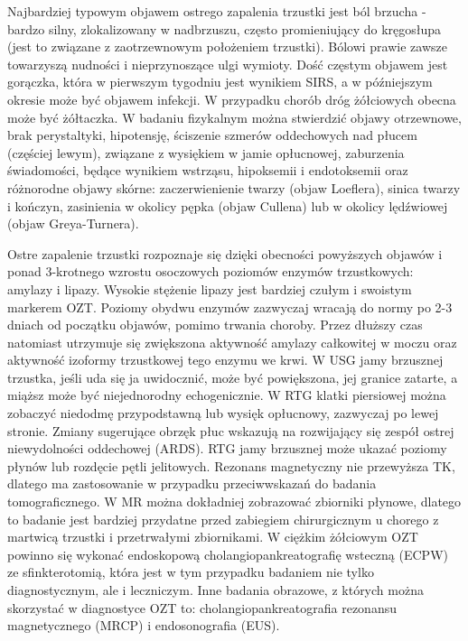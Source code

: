 \documentclass[a4paper, 12pt]{report}
\begin{document}
Najbardziej typowym objawem ostrego zapalenia trzustki jest ból
brzucha - bardzo silny, zlokalizowany w nadbrzuszu, często
promieniujący do kręgosłupa (jest to związane z zaotrzewnowym
położeniem trzustki). Bólowi prawie zawsze towarzyszą nudności i
nieprzynoszące ulgi wymioty. Dość częstym objawem jest gorączka, która
w pierwszym tygodniu jest wynikiem SIRS, a w późniejszym okresie może
być objawem infekcji. W przypadku chorób dróg żółciowych obecna może
być żółtaczka. W badaniu fizykalnym można stwierdzić objawy
otrzewnowe, brak perystaltyki, hipotensję, ściszenie szmerów
oddechowych nad płucem (częściej lewym), związane z wysiękiem w jamie
opłucnowej, zaburzenia świadomości, będące wynikiem wstrząsu,
hipoksemii i endotoksemii oraz różnorodne objawy skórne:
zaczerwienienie twarzy (objaw Loeflera), sinica twarzy i kończyn,
zasinienia w okolicy pępka (objaw Cullena) lub w okolicy lędźwiowej
(objaw Greya-Turnera).

Ostre zapalenie trzustki rozpoznaje się dzięki obecności powyższych
objawów i ponad 3-krotnego wzrostu osoczowych poziomów enzymów
trzustkowych: amylazy i lipazy. Wysokie stężenie lipazy jest bardziej
czułym i swoistym markerem OZT. Poziomy obydwu enzymów zazwyczaj
wracają do normy po 2-3 dniach od początku objawów, pomimo trwania
choroby. Przez dłuższy czas natomiast utrzymuje się zwiększona
aktywność amylazy całkowitej w moczu oraz aktywność izoformy
trzustkowej tego enzymu we krwi. W USG jamy brzusznej trzustka, jeśli
uda się ja uwidocznić, może być powiększona, jej granice zatarte, a
miąższ może być niejednorodny echogenicznie.  W RTG klatki piersiowej
można zobaczyć niedodmę przypodstawną lub wysięk opłucnowy, zazwyczaj
po lewej stronie. Zmiany sugerujące obrzęk płuc wskazują na
rozwijający się zespół ostrej niewydolności oddechowej (ARDS). RTG
jamy brzusznej może ukazać poziomy płynów lub rozdęcie pętli
jelitowych. Rezonans magnetyczny nie przewyższa TK, dlatego ma
zastosowanie w przypadku przeciwwskazań do badania tomograficznego. W
MR można dokładniej zobrazować zbiorniki płynowe, dlatego to badanie
jest bardziej przydatne przed zabiegiem chirurgicznym u chorego z
martwicą trzustki i przetrwałymi zbiornikami. W ciężkim żółciowym OZT
powinno się wykonać endoskopową cholangiopankreatografię wsteczną
(ECPW) ze sfinkterotomią, która jest w tym przypadku badaniem nie
tylko diagnostycznym, ale i leczniczym.  Inne badania obrazowe, z
których można skorzystać w diagnostyce OZT to:
cholangiopankreatografia rezonansu magnetycznego (MRCP) i
endosonografia (EUS).
\end{document}
